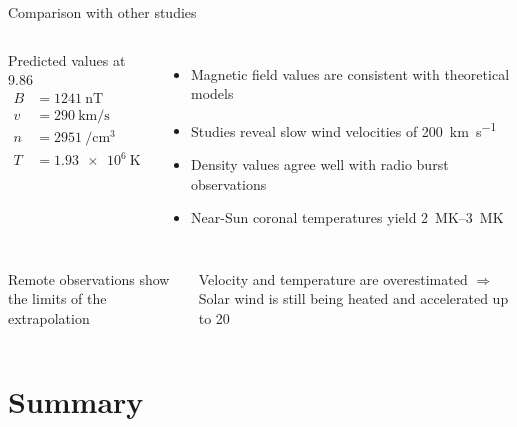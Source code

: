 \begin{frame}[plain,c]{Comparison with other studies}{}
	\begin{columns}[c]
		
		\begin{block}{\centering Predicted values at 9.86\,\Rs{}}
			\begin{align*}
				B &= \SI{1241}{\nano\tesla}\\
				v &= \SI{290}{\km\per\s}\\
				n &= \SI{2951}{\per\cm\cubed}\\
				T &= \SI{1.93e6}{\kelvin}
			\end{align*}
		\end{block}


		\begin{itemize}[<+->]
			\item Magnetic field values are consistent with theoretical models \citep{Parker1958,Banaszkiewicz1998}
			\item Studies reveal slow wind velocities of \SI{200}{\km\per\s} \citep{Sheeley1997,Wang2000}
			\item Density values agree well with radio burst observations \citep{Leblanc1998}
			\item Near-Sun coronal temperatures yield \SIrange{2}{3}{\mega\kelvin} \citep{Billings1959,Liebenberg1975}
		\end{itemize}
	\end{columns}
	
	\vspace{5mm}
	
	\begin{columns}[c]
	\column<+->{\textwidth}
	
		Remote observations show the limits of the extrapolation

		\begin{block}{Velocity and temperature are overestimated}
			\centering $\Rightarrow$ Solar wind is still being heated and accelerated up to 20\,\Rs{}
		\end{block}
	
	\end{columns}
\end{frame}


\section{Summary}

